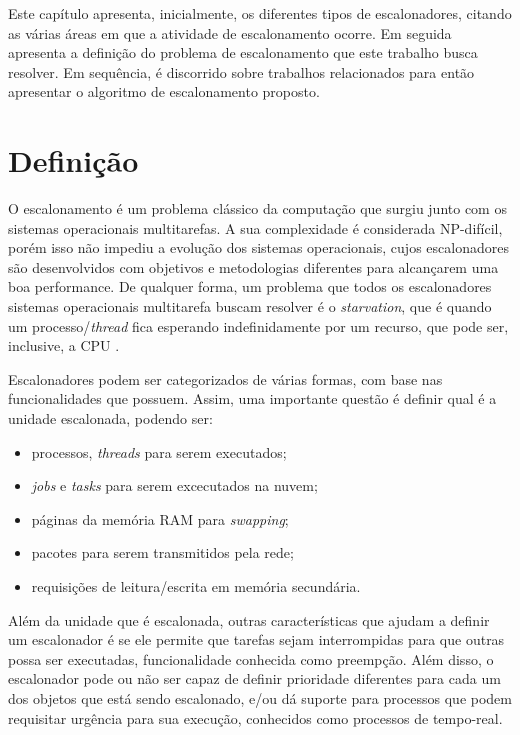 Este capítulo apresenta, inicialmente, os diferentes tipos de escalonadores, citando as várias áreas em que a atividade de escalonamento ocorre. Em seguida apresenta a definição do problema de escalonamento que este trabalho busca resolver. Em sequência, é discorrido sobre trabalhos relacionados para então apresentar o algoritmo de escalonamento proposto.

\section{Definição}

O escalonamento é um problema clássico da computação que surgiu junto com os sistemas operacionais multitarefas. A sua complexidade é considerada NP-difícil\cite{ULLMAN1975384}, porém isso não impediu a evolução dos sistemas operacionais, cujos escalonadores são desenvolvidos com objetivos e metodologias diferentes para alcançarem uma boa performance. De qualquer forma, um problema que todos os escalonadores sistemas operacionais multitarefa buscam resolver é o \textit{starvation}, que é quando um processo/\textit{thread} fica esperando indefinidamente por um recurso, que pode ser, inclusive, a \acrshort{CPU} \cite{TANEMBAUM_SO}.

Escalonadores podem ser categorizados de várias formas, com base nas funcionalidades que possuem. Assim, uma importante questão é definir qual é a unidade escalonada, podendo ser\cite{TANEMBAUM_SO}:

	\begin{itemize}
		\item processos, \textit{threads} para serem executados;
		\item \textit{jobs} e \textit{tasks} para serem excecutados na nuvem;
		\item páginas da memória \acrfull{RAM} para \textit{swapping};
		\item pacotes para serem transmitidos pela rede;
		\item requisições de leitura/escrita em memória secundária.
	\end{itemize}

	Além da unidade que é escalonada, outras características que ajudam a definir um escalonador é se ele permite que tarefas sejam interrompidas para que outras possa ser executadas, funcionalidade conhecida como preempção. Além disso, o escalonador pode ou não ser capaz de definir prioridade diferentes para cada um dos objetos que está sendo escalonado, e/ou dá suporte para processos que podem requisitar urgência para sua execução, conhecidos como processos de tempo-real\cite{TANEMBAUM_SO}.

